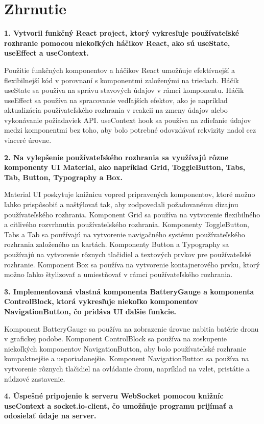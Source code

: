 \section{Zhrnutie}
\textbf{1. Vytvoril funkčný React project, ktorý vykresľuje používateľské rozhranie pomocou niekoľkých háčikov React, ako sú useState, useEffect a useContext.}

Použitie funkčných komponentov a háčikov React umožňuje efektívnejší a flexibilnejší kód v porovnaní s komponentmi založenými na triedach.
Háčik useState sa používa na správu stavových údajov v rámci komponentu.
Háčik useEffect sa používa na spracovanie vedľajších efektov, ako je napríklad aktualizácia používateľského rozhrania v reakcii na zmeny údajov alebo vykonávanie požiadaviek API.
useContext hook sa používa na zdieľanie údajov medzi komponentmi bez toho, aby bolo potrebné odovzdávať rekvizity nadol cez viaceré úrovne.

\textbf{2. Na vylepšenie používateľského rozhrania sa využívajú rôzne komponenty UI Material, ako napríklad Grid, ToggleButton, Tabs, Tab, Button, Typography a Box.}

Material UI poskytuje knižnicu vopred pripravených komponentov, ktoré možno ľahko prispôsobiť a naštýlovať tak, aby zodpovedali požadovanému dizajnu používateľského rozhrania.
Komponent Grid sa používa na vytvorenie flexibilného a citlivého rozvrhnutia používateľského rozhrania.
Komponenty ToggleButton, Tabs a Tab sa používajú na vytvorenie navigačného systému používateľského rozhrania založeného na kartách.
Komponenty Button a Typography sa používajú na vytvorenie rôznych tlačidiel a textových prvkov pre používateľské rozhranie.
Komponent Box sa používa na vytvorenie kontajnerového prvku, ktorý možno ľahko štylizovať a umiestňovať v rámci používateľského rozhrania.

\textbf{3. Implementovaná vlastná komponenta BatteryGauge a komponenta ControlBlock, ktorá vykresľuje niekoľko komponentov NavigationButton, čo pridáva UI ďalšie funkcie.}

Komponent BatteryGauge sa používa na zobrazenie úrovne nabitia batérie dronu v grafickej podobe.
Komponent ControlBlock sa používa na zoskupenie niekoľkých komponentov NavigationButton, aby bolo používateľské rozhranie kompaktnejšie a usporiadanejšie.
Komponent NavigationButton sa používa na vytvorenie rôznych tlačidiel na ovládanie dronu, napríklad na vzlet, pristátie a núdzové zastavenie.

\textbf{4. Úspešné pripojenie k serveru WebSocket pomocou knižníc useContext a socket.io-client, čo umožňuje programu prijímať a odosielať údaje na server.}

